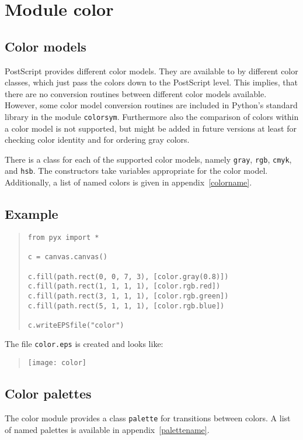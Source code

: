 \chapter{Module color}
\label{color}
\section{Color models}
PostScript provides different color models. They are available to
\PyX{} by different color classes, which just pass the colors down to
the PostScript level. This implies, that there are no conversion
routines between different color models available. However, some color
model conversion routines are included in Python's standard library in
the module \texttt{colorsym}. Furthermore also the comparison of
colors within a color model is not supported, but might be added in
future versions at least for checking color identity and for ordering
gray colors.

There is a class for each of the supported color models, namely
\verb|gray|, \verb|rgb|, \verb|cmyk|, and \verb|hsb|. The constructors
take variables appropriate for the color model. Additionally, a list of
named colors is given in appendix~\ref{colorname}.

\section{Example}
\begin{quote}
\begin{verbatim}
from pyx import *

c = canvas.canvas()

c.fill(path.rect(0, 0, 7, 3), [color.gray(0.8)])
c.fill(path.rect(1, 1, 1, 1), [color.rgb.red])
c.fill(path.rect(3, 1, 1, 1), [color.rgb.green])
c.fill(path.rect(5, 1, 1, 1), [color.rgb.blue])

c.writeEPSfile("color")
\end{verbatim}
\end{quote}

The file \verb|color.eps| is created and looks like:
\begin{quote}
\texttt{[image: color]}
\end{quote}

\section{Color palettes}

The color module provides a class \verb|palette| for transitions between
colors. A list of named palettes is available in appendix~\ref{palettename}.

